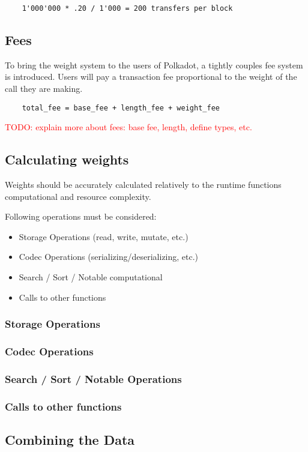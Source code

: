 \documentclass[11pt,a4paper]{article}
\newcommand{\todo}[1]{\textcolor{red}{TODO: #1}}
\begin{document}
\begin{verbatim}
    1'000'000 * .20 / 1'000 = 200 transfers per block
\end{verbatim}

\subsection{Fees}
To bring the weight system to the users of Polkadot, a tightly couples fee system
is introduced. Users will pay a transaction fee proportional to the weight of the
call they are making.

\begin{verbatim}
    total_fee = base_fee + length_fee + weight_fee
\end{verbatim}

\todo{explain more about fees: base fee, length, define types, etc.}

\subsection{Calculating weights}
Weights should be accurately calculated relatively to the runtime functions
computational and resource complexity.

Following operations must be considered:

\begin{itemize}
\item Storage Operations (read, write, mutate, etc.)
\item Codec Operations (serializing/deserializing, etc.)
\item Search / Sort / Notable computational
\item Calls to other functions
\end{itemize}

\subsubsection{Storage Operations}
\subsubsection{Codec Operations}
\subsubsection{Search / Sort / Notable Operations}
\subsubsection{Calls to other functions}

\subsection{Combining the Data}
\end{document}
